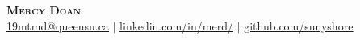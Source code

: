 
\begin{center}
    \textbf{\Huge \scshape Mercy Doan} \\ \vspace{1pt} \href{mailto:19mtmd@queensu.ca}{\underline{19mtmd@queensu.ca}} $|$ 
    \href{https://www.linkedin.com/in/merd/}{\underline{linkedin.com/in/merd/}} $|$
    \href{https://github.com/sunyshore}{\underline{github.com/sunyshore}}
\end{center}